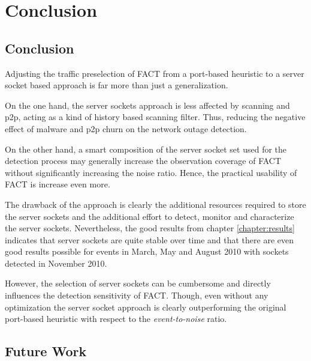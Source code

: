 \chapter{Conclusion\label{Conclusion}}

\section{Conclusion}
Adjusting the traffic preselection of FACT from a port-based heuristic to a 
server socket based approach is far more than just a generalization. 

On the one hand, the server sockets approach is less affected by scanning and 
p2p, acting as a kind of history based scanning filter. Thus, reducing the 
negative effect of malware and p2p churn on the network outage detection. 

On the other hand, a smart composition of the server socket set used for the 
detection process may generally increase the observation coverage of FACT 
without significantly increasing the noise ratio. Hence, the practical usability 
of FACT is increase even more.

The drawback of the approach is clearly the additional resources required to 
store the server sockets and the additional effort to detect, monitor and 
characterize the server sockets. Nevertheless, the good results from chapter 
\ref{chapter:results} indicates that server sockets are quite stable over time 
and that there are even good results possible for events in March, May and 
August 2010 with sockets detected in November 2010. 

However, the selection of server sockets can be cumbersome and directly 
influences the detection sensitivity of FACT. Though, even without any 
optimization the server socket approach is clearly outperforming the original port-based heuristic with respect to the \emph{event-to-noise} ratio. 

\section{Future Work}





